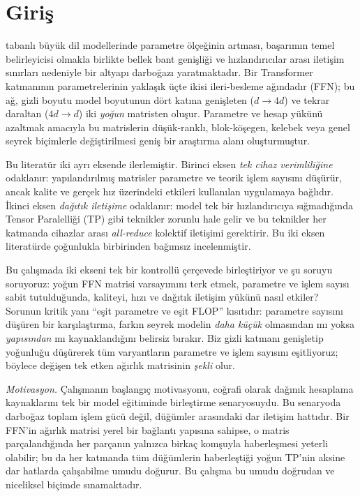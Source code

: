 \documentclass[10pt,journal]{IEEEtran}
\begin{document}
\IEEEpeerreviewmaketitle

\section{Giriş}
 \cite{vaswani2017} tabanlı büyük dil modellerinde parametre
ölçeğinin artması,
başarımın temel belirleyicisi olmakla birlikte \cite{kaplan2020,chinchilla2022} bellek bant
genişliği ve hızlandırıcılar
arası iletişim sınırları nedeniyle bir altyapı darboğazı yaratmaktadır. Bir Transformer
katmanının parametrelerinin yaklaşık üçte ikisi ileri-besleme ağındadır (FFN); bu ağ, gizli
boyutu model boyutunun dört katına genişleten ($d \rightarrow 4d$) ve tekrar daraltan
($4d \rightarrow d$) iki \emph{yoğun} matristen oluşur. Parametre ve hesap yükünü azaltmak
amacıyla bu matrislerin düşük-ranklı, blok-köşegen, kelebek veya genel seyrek biçimlerle
değiştirilmesi geniş bir araştırma alanı oluşturmuştur.

Bu literatür iki ayrı eksende ilerlemiştir. Birinci eksen \emph{tek cihaz verimliliğine}
odaklanır: yapılandırılmış matrisler parametre ve teorik işlem sayısını düşürür, ancak
kalite ve gerçek hız üzerindeki etkileri kullanılan uygulamaya bağlıdır. İkinci eksen
\emph{dağıtık iletişime} odaklanır: model tek bir hızlandırıcıya sığmadığında Tensor
Paralelliği (TP) gibi teknikler zorunlu hale gelir ve bu teknikler her katmanda cihazlar
arası \emph{all-reduce} kolektif iletişimi gerektirir. Bu iki eksen literatürde çoğunlukla
birbirinden bağımsız incelenmiştir.

Bu çalışmada iki ekseni tek bir kontrollü çerçevede birleştiriyor ve şu soruyu soruyoruz:
yoğun FFN matrisi varsayımını terk etmek, parametre ve işlem sayısı sabit tutulduğunda,
kaliteyi, hızı ve dağıtık iletişim yükünü nasıl etkiler? Sorunun kritik yanı ``eşit parametre
ve eşit FLOP'' kısıtıdır: parametre sayısını düşüren bir karşılaştırma, farkın seyrek modelin
\emph{daha küçük} olmasından mı yoksa \emph{yapısından} mı kaynaklandığını belirsiz bırakır.
Biz gizli katmanı genişletip yoğunluğu düşürerek tüm varyantların parametre ve işlem sayısını
eşitliyoruz; böylece değişen tek etken ağırlık matrisinin \emph{şekli} olur.

\emph{Motivasyon.} Çalışmanın başlangıç motivasyonu, coğrafi olarak dağınık hesaplama
kaynaklarını tek bir model eğitiminde birleştirme senaryosuydu. Bu senaryoda darboğaz toplam
işlem gücü değil, düğümler arasındaki dar iletişim hattıdır. Bir FFN'in ağırlık matrisi yerel
bir bağlantı yapısına sahipse, o matris parçalandığında her parçanın yalnızca birkaç komşuyla
haberleşmesi yeterli olabilir; bu da her katmanda tüm düğümlerin haberleştiği yoğun TP'nin
aksine dar hatlarda çalışabilme umudu doğurur. Bu çalışma bu umudu doğrudan ve niceliksel
biçimde sınamaktadır.
\end{document}
